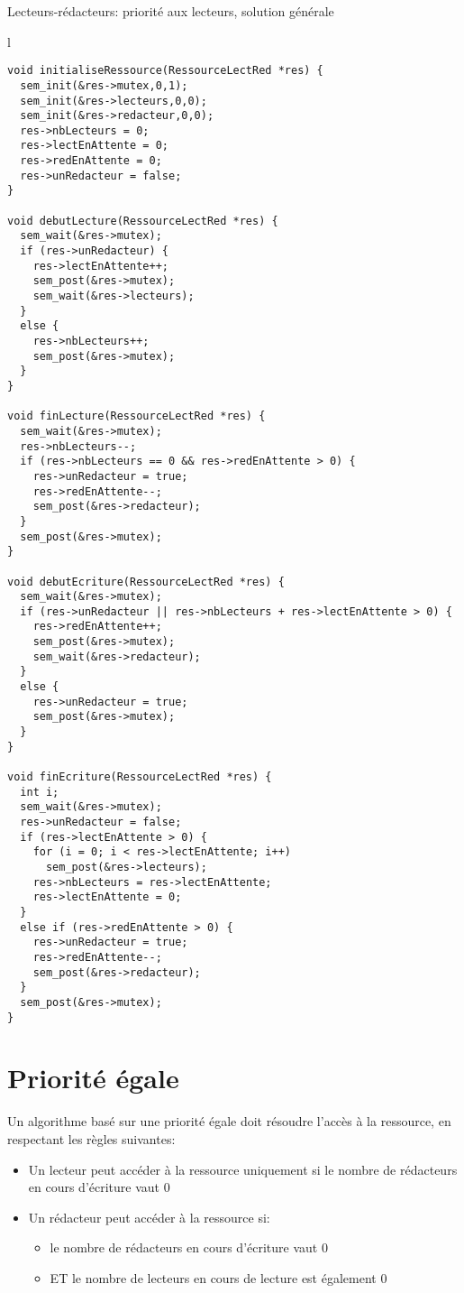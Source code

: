 \begin{algorithm}[h!tp]
\caption{Lecteurs-rédacteurs: priorité aux lecteurs, solution générale}\label{lectred:prioritelecteurgenerale}
\centering
\begin{tabular}{l}
\lstset{language=C++}
\begin{lstlisting}
void initialiseRessource(RessourceLectRed *res) {
  sem_init(&res->mutex,0,1);
  sem_init(&res->lecteurs,0,0);
  sem_init(&res->redacteur,0,0);
  res->nbLecteurs = 0;
  res->lectEnAttente = 0;
  res->redEnAttente = 0;
  res->unRedacteur = false;
}

void debutLecture(RessourceLectRed *res) {
  sem_wait(&res->mutex);
  if (res->unRedacteur) {
    res->lectEnAttente++;
    sem_post(&res->mutex);
    sem_wait(&res->lecteurs);
  }
  else {
    res->nbLecteurs++;
    sem_post(&res->mutex);
  }
}

void finLecture(RessourceLectRed *res) {
  sem_wait(&res->mutex);
  res->nbLecteurs--;
  if (res->nbLecteurs == 0 && res->redEnAttente > 0) {
    res->unRedacteur = true;
    res->redEnAttente--;
    sem_post(&res->redacteur);
  }
  sem_post(&res->mutex);
}

void debutEcriture(RessourceLectRed *res) {
  sem_wait(&res->mutex);
  if (res->unRedacteur || res->nbLecteurs + res->lectEnAttente > 0) {
    res->redEnAttente++;
    sem_post(&res->mutex);
    sem_wait(&res->redacteur);
  }
  else {
    res->unRedacteur = true;
    sem_post(&res->mutex);
  }
}

void finEcriture(RessourceLectRed *res) {
  int i;
  sem_wait(&res->mutex);
  res->unRedacteur = false;
  if (res->lectEnAttente > 0) {
    for (i = 0; i < res->lectEnAttente; i++)
      sem_post(&res->lecteurs);
    res->nbLecteurs = res->lectEnAttente;
    res->lectEnAttente = 0;
  }
  else if (res->redEnAttente > 0) {
    res->unRedacteur = true;
    res->redEnAttente--;
    sem_post(&res->redacteur);
  }
  sem_post(&res->mutex);
}
\end{lstlisting}
\end{tabular}

\end{algorithm}


\section{Priorité égale}
Un algorithme basé sur une priorité égale doit résoudre l'accès à la ressource, en respectant les règles suivantes:
\begin{itemize}
\item Un lecteur peut accéder à la ressource uniquement si le nombre de rédacteurs en cours d'écriture vaut 0
\item Un rédacteur peut accéder à la ressource si:
\begin{itemize}
\item le nombre de rédacteurs en cours d'écriture vaut 0
\item ET le nombre de lecteurs en cours de lecture est également 0
\end{itemize}
\end{itemize}


